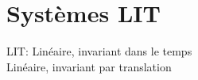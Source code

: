 \documentclass[a4paper]{amsart}
\begin{document}
\begin{comment}
\subsection{Dilatation et translations de signaux}
\begin{itemize}
	\item Décalage: $f(t-t_0)$ est équivalent à $f(t)$ décalé de $t_0$ vers la \textbf{droite}, le signal est en \textbf{retard}.
	\item Dilatation: $f(at)$, le signal $f(t)$ est dilaté (shrinked) de $a$, si $a>0$ sinon le signal est "expanded".
	\item Amplitude: $af(t)$.
\end{itemize}
Résumé: $af(b(t-t_0))$, est équivalent au signal $f(t)$ décalé de $t_0$ (vers la droite), dilaté de $b$, et avec amplitude modulée de $a$.


\section{Convolution}
\begin{eqnarray}
	(f*g)(t)\stackrel{\mathrm{def}}{=}\ \int_{-\infty}^{\infty} f(\tau)\, g(t - \tau)\, d\tau
\end{eqnarray}
\begin{comment}
	

\subsection{Propriétés de la convolution}
\begin{itemize}
	\item Commutativité
	\begin{eqnarray}
		(f*g)(t)=(g*f)(t)
	\end{eqnarray}
	\item Distributivité
	\begin{eqnarray}
		(af(t)+bg(t))*h(t)=a(f*h)(t)+b(g*h)(t)
	\end{eqnarray}
	\item Associativité
	\begin{eqnarray}
		(f*g)*h=f*(g*h)
	\end{eqnarray}
\end{itemize}
\end{comment}
\section{Systèmes LIT}
LIT: Linéaire, invariant dans le temps
\\Linéaire, invariant par translation
\end{document}
